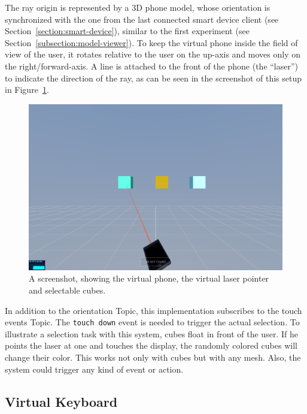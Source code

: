The ray origin is represented by a \gls{3D} phone model, whose orientation is synchronized with the one from the last connected smart device client (see Section~\ref{section:smart-device}), similar to the first experiment (see Section~\ref{subsection:model-viewer}). To keep the virtual phone inside the field of view of the user, it rotates relative to the user on the up-axis and moves only on the right/forward-axis.
A line is attached to the front of the phone (the \enquote{laser}) to indicate the direction of the ray, as can be seen in the screenshot of this setup in Figure~\ref{fig:screenshot-exp-lp}.

\begin{figure}[H]
	\centering
	\includegraphics[width=12cm]{figures/implementation/screenshot_exp_lp.png}
	\caption[Screenshot of the laser pointer]{A screenshot, showing the virtual phone, the virtual laser pointer and selectable cubes.}\label{fig:screenshot-exp-lp}
\end{figure}

In addition to the orientation Topic, this implementation subscribes to the touch events Topic. The \lstinline{touch down} event is needed to trigger the actual selection.
To illustrate a selection task with this system, cubes float in front of the user. 
If he points the laser at one and touches the display, the randomly colored cubes will change their color. This works not only with cubes but with any mesh. Also, the system could trigger any kind of event or action.


\subsection{Virtual Keyboard}\label{subsection:virtual-keyboard}

